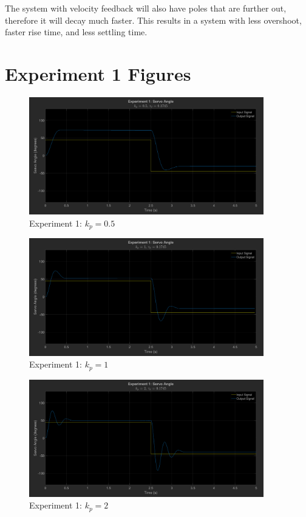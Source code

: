 \documentclass[12pt]{article}
\begin{document}
The system with velocity feedback will also have poles that are further out, therefore it will decay much faster. This results in a system with less overshoot, faster rise time, and less settling time. 

\clearpage
\appendix
\section{Experiment 1 Figures} \label{appendix:exp1fig}
\begin{figure}[h]
    \centering
    \includegraphics[width=0.91\textwidth]{exp1_kp0.5}
    \caption{Experiment 1: $k_p = 0.5$}
\end{figure}
\begin{figure}[h]
    \centering
    \includegraphics[width=0.91\textwidth]{exp1_kp1}
    \caption{Experiment 1: $k_p = 1$}
\end{figure}
\begin{figure}[h]
    \centering
    \includegraphics[width=0.91\textwidth]{exp1_kp2}
    \caption{Experiment 1: $k_p = 2$}
\end{figure}
\end{document}
